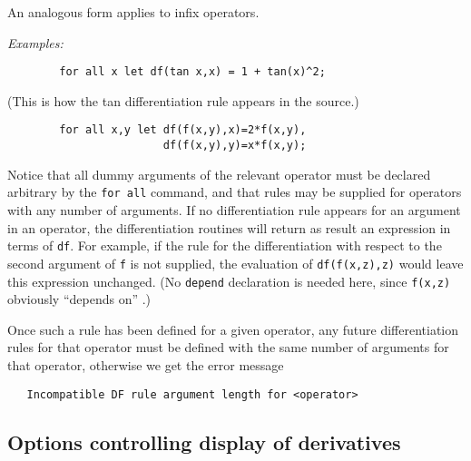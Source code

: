 An analogous form applies to infix operators.

\textit{Examples:}
\begin{verbatim}
        for all x let df(tan x,x) = 1 + tan(x)^2;
\end{verbatim}
(This is how the tan differentiation rule appears in the {\REDUCE}
source.)
\begin{verbatim}
        for all x,y let df(f(x,y),x)=2*f(x,y),
                        df(f(x,y),y)=x*f(x,y);
\end{verbatim}
Notice that all dummy arguments of the relevant operator must be declared
arbitrary by the \texttt{for all} command, and that rules may be supplied for
operators with any number of arguments.  If no differentiation rule
appears for an argument in an operator, the differentiation routines will
return as result an expression in terms of \texttt{df}.  For
example, if the rule for the differentiation with respect to the second
argument of \texttt{f} is not supplied, the evaluation of \texttt{df(f(x,z),z)}
would leave this expression unchanged. (No \texttt{depend} declaration
is needed here, since \texttt{f(x,z)} obviously ``depends on'' .)

Once such a rule has been defined for a given operator, any future
differentiation rules for that operator must be
defined with the same number of arguments for that operator, otherwise we
get the error message
\begin{verbatim}
   Incompatible DF rule argument length for <operator>
\end{verbatim}


\subsection{Options controlling display of derivatives}
\hypertarget{switch:DFPRINT}{}


